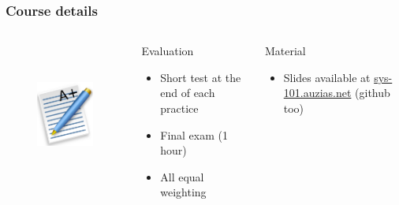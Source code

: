   \begin{frame}
    \frametitle{Course details}
    \begin{columns}
        \begin{figure}[t]
          \centering
          \includegraphics[height=4cm]{./imgs/grade.pdf}
          \label{fig:marks}
        \end{figure}
        \begin{block}{Evaluation}
          \begin{itemize}
            \item Short test at the end of each practice
            \item Final exam (1 hour)
            \item All equal weighting
          \end{itemize}
        \end{block}
        \begin{block}{Material}
          \begin{itemize}
            \item Slides available at \color{blue}\href{http://sys-101.auzias.net}{sys-101.auzias.net} \color{black} (github too)
          \end{itemize}
        \end{block}
    \end{columns}
  \end{frame}

